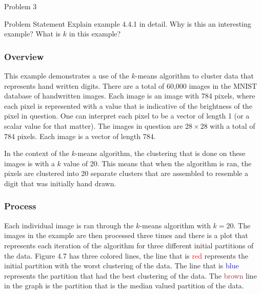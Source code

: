 \begin{problem}{Problem 3}
    \begin{statement}{Problem Statement}
        Explain example 4.4.1 in detail. Why is this an interesting example? What is $k$ in this example?
    \end{statement}

    \begin{Highlight}[Solution]
        \subsubsection*{Overview}

        This example demonstrates a use of the $k$-means algorithm to cluster data that represents hand written digits. There are a total of 60,000 images in the MNIST database of handwritten images.
        Each image is an image with 784 pixels, where each pixel is represented with a value that is indicative of the brightness of the pixel in question. One can interpret each pixel to be a vector
        of length 1 (or a scalar value for that matter). The images in question are $28 \times 28$ with a total of 784 pixels. Each image is a vector of length 784.

        In the context of the $k$-means algorithm, the clustering that is done on these images is with a $k$ value of 20. This means that when the algorithm is ran, the pixels are clustered into 20
        separate clusters that are assembled to resemble a digit that was initially hand drawn. \vspace*{1em}

        \subsubsection*{Process}

        Each individual image is ran through the $k$-means algorithm with $k = 20$. The images in the example are then processed three times and there is a plot that represents each iteration of the
        algorithm for three different initial partitions of the data. Figure 4.7 has three colored lines, the line that is \textcolor{red}{red} represents the initial partition with the worst clustering
        of the data. The line that is \textcolor{blue}{blue} represents the partition that had the best clustering of the data. The \textcolor{brown}{brown} line in the graph is the partition that is
        the median valued partition of the data. \vspace*{1em}


\end{Highlight}
\end{problem}
